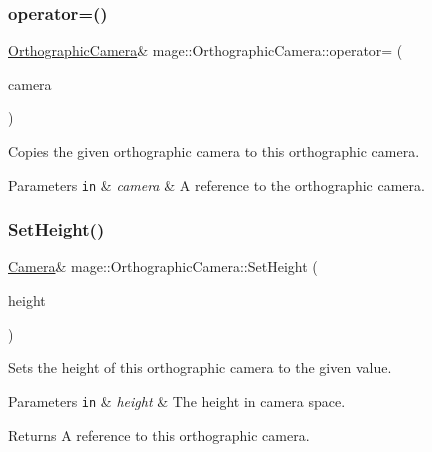\subsubsection{\texorpdfstring{operator=()}{operator=()}\hspace{0.1cm}{\footnotesize\ttfamily [2/2]}}
{\footnotesize\ttfamily \hyperlink{classmage_1_1_orthographic_camera}{Orthographic\+Camera}\& mage\+::\+Orthographic\+Camera\+::operator= (\begin{DoxyParamCaption}\item[{\hyperlink{classmage_1_1_orthographic_camera}{Orthographic\+Camera} \&\&}]{camera }\end{DoxyParamCaption})\hspace{0.3cm}{\ttfamily [default]}}

Copies the given orthographic camera to this orthographic camera.


\begin{DoxyParams}[1]{Parameters}
\mbox{\tt in}  & {\em camera} & A reference to the orthographic camera. \\
\hline
\end{DoxyParams}
\hypertarget{classmage_1_1_orthographic_camera_ac9c1f87e2cf085b7c62d7f6e34eeb944}{}\label{classmage_1_1_orthographic_camera_ac9c1f87e2cf085b7c62d7f6e34eeb944} 
\subsubsection{\texorpdfstring{Set\+Height()}{SetHeight()}}
{\footnotesize\ttfamily \hyperlink{classmage_1_1_camera}{Camera}\& mage\+::\+Orthographic\+Camera\+::\+Set\+Height (\begin{DoxyParamCaption}\item[{float}]{height }\end{DoxyParamCaption})}

Sets the height of this orthographic camera to the given value.


\begin{DoxyParams}[1]{Parameters}
\mbox{\tt in}  & {\em height} & The height in camera space. \\
\hline
\end{DoxyParams}
\begin{DoxyReturn}{Returns}
A reference to this orthographic camera. 
\end{DoxyReturn}
\hypertarget{classmage_1_1_orthographic_camera_a10e09af47e741ab76dc2aa2a03f04c06}{}\label{classmage_1_1_orthographic_camera_a10e09af47e741ab76dc2aa2a03f04c06} 
